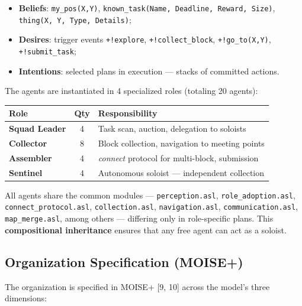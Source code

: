 \documentclass[11pt,a4paper]{article}
\newcommand{\code}[1]{\texttt{#1}}
\begin{document}
\begin{itemize}
  \item \textbf{Beliefs}: \code{my\_pos(X,Y)}, \code{known\_task(Name, Deadline, Reward, Size)}, \code{thing(X, Y, Type, Details)};
  \item \textbf{Desires}: trigger events \code{+!explore}, \code{+!collect\_block}, \code{+!go\_to(X,Y)}, \code{+!submit\_task};
  \item \textbf{Intentions}: selected plans in execution --- stacks of committed actions.
\end{itemize}

The agents are instantiated in 4 specialized roles (totaling 20 agents):

\begin{table}[H]
\centering
\begin{tabularx}{\linewidth}{l c X}
\toprule
\textbf{Role} & \textbf{Qty} & \textbf{Responsibility} \\
\midrule
\textbf{Squad Leader} & 4 & Task scan, auction, delegation to soloists \\
\textbf{Collector} & 8 & Block collection, navigation to meeting points \\
\textbf{Assembler} & 4 & \emph{connect} protocol for multi-block, submission \\
\textbf{Sentinel} & 4 & Autonomous soloist --- independent collection \\
\bottomrule
\end{tabularx}
\end{table}

All agents share the common modules --- \code{perception.asl}, \code{role\_adoption.asl}, \code{connect\_protocol.asl}, \code{collection.asl}, \code{navigation.asl}, \code{communication.asl}, \code{map\_merge.asl}, among others --- differing only in role-specific plans. This \textbf{compositional inheritance} ensures that any free agent can act as a soloist.

\subsection{Organization Specification (MOISE+)}
The organization is specified in MOISE+ [9, 10] across the model's three dimensions:
\end{document}
